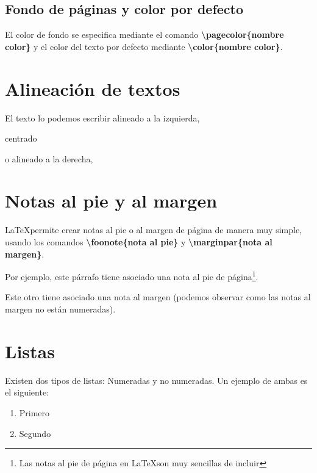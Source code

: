 \documentclass[12pt]{book} %
\begin{document}
\subsection{Fondo de páginas y color por defecto}

El color de fondo se especifica mediante el comando \textbf{\textbackslash pagecolor\{nombre color\}} y el color del texto por defecto mediante  \textbf{\textbackslash color\{nombre color\}}.

\section{Alineación de textos}

\begin{flushleft}
El texto lo podemos escribir alineado a la izquierda,	
\end{flushleft}

\begin{center}
centrado
\end{center}

\begin{flushright}
o alineado a la derecha,	
\end{flushright}

\section{Notas al pie y al margen}

\LaTeX permite crear notas al pie o al margen de página de manera muy simple, usando los comandos \textbf{\textbackslash foonote\{nota al pie\}} y \textbf{\textbackslash marginpar\{nota al margen\}}.

Por ejemplo, este párrafo tiene asociado una nota al pie de página\footnote{Las notas al pie de página en \LaTeX son muy sencillas de incluir}.

Este otro tiene asociado una nota al margen (podemos observar como las notas al margen no están numeradas).

\section{Listas}

Existen dos tipos de listas: Numeradas y no numeradas. Un ejemplo de ambas es el siguiente:

\begin{enumerate}
\item Primero
\item Segundo
\end{enumerate}
\end{document}

